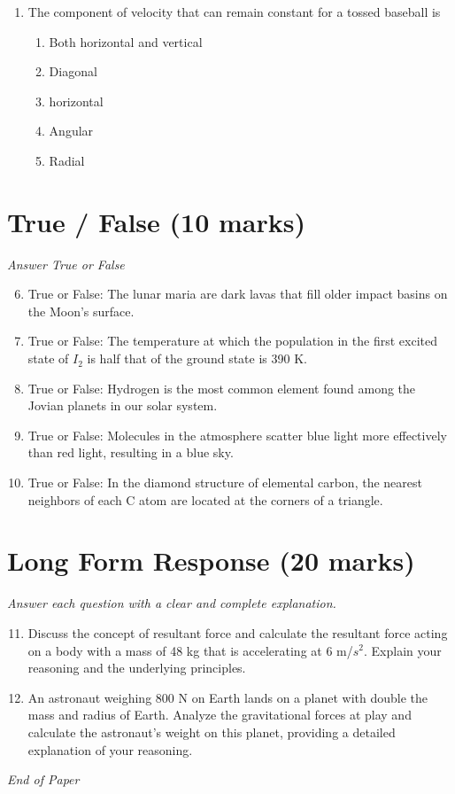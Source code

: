 \documentclass[12pt]{article}
\begin{document}
\begin{enumerate}[label=\arabic*.]
\begin{enumerate}[label=(\alph*)]
    \item - 0.52 m/sec
    \item - 0.45 m/sec
    \item - 0.38 m/sec
    \item - 0.60 m/sec
\end{enumerate}
\item The component of velocity that can remain constant for a tossed baseball is
\begin{enumerate}[label=(\alph*)]
    \item Both horizontal and vertical
    \item Diagonal
    \item horizontal
    \item Angular
    \item Radial
\end{enumerate}
\end{enumerate}

\section*{True / False (10 marks)}
\textit{Answer True or False}
\begin{enumerate}[label=\arabic*.]
\setcounter{enumi}{5}
\item True or False: The lunar maria are dark lavas that fill older impact basins on the Moon's surface.
\item True or False: The temperature at which the population in the first excited state of $I_2$ is half that of the ground state is 390 K.
\item True or False: Hydrogen is the most common element found among the Jovian planets in our solar system.
\item True or False: Molecules in the atmosphere scatter blue light more effectively than red light, resulting in a blue sky.
\item True or False: In the diamond structure of elemental carbon, the nearest neighbors of each C atom are located at the corners of a triangle.
\end{enumerate}

\section*{Long Form Response (20 marks)}
\textit{Answer each question with a clear and complete explanation.}
\begin{enumerate}[label=\arabic*.]
\setcounter{enumi}{10}
\item Discuss the concept of resultant force and calculate the resultant force acting on a body with a mass of 48 kg that is accelerating at 6 m/$s^2$. Explain your reasoning and the underlying principles.
\item An astronaut weighing 800 N on Earth lands on a planet with double the mass and radius of Earth. Analyze the gravitational forces at play and calculate the astronaut's weight on this planet, providing a detailed explanation of your reasoning.
\end{enumerate}

\vfill
\noindent\textit{End of Paper}
\end{document}
